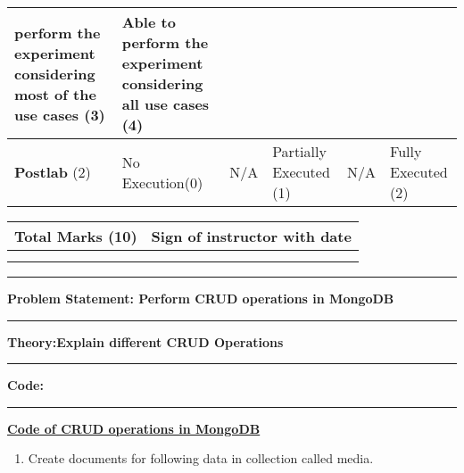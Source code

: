\documentclass[11pt,article]{memoir}
\begin{document}
\begin{flushleft}
\begin{tabular}{|p{2cm}|p{2cm}|p{2cm}|p{2cm}|p{2cm}|p{2cm}|}
                              perform the
                              experiment
                              considering
                              most of the
                              use cases (3)
                              & Able to
                              perform the
                              experiment
                              considering
                              all use cases
                              (4) \\ 
                             \hline \textbf{Postlab} (2) & No Execution(0) & N/A & Partially Executed (1) & N/A & Fully Executed (2) \\ 
                             \hline 
                             \end{tabular}
        \begin{table}[h!]
        \centering
        \begin{tabular}{|c|c|}
                \hline \textbf{Total Marks (10)} & \textbf{Sign of instructor with date} \\ 
                \hline  &  \\ & \\
                \hline 
                \end{tabular} 
        \end{table}
        
    \pagebreak


\maketitle

\hrule \vspace{0.2cm}
\textbf{Problem Statement: Perform CRUD operations in MongoDB}\hrule\vspace{0.2cm}
\textbf{Theory:Explain different CRUD Operations}\hrule\vspace{0.2cm}
\afterpage{\newpage~\newpage}\newpage
\textbf{Code:}\hrule
\vspace{0.5cm}
\textbf{\underline{Code of CRUD operations in MongoDB}}
\begin{enumerate}
\item Create documents for following data in collection called media.

\begin{table}[h]



\end{table}
\end{enumerate}
\end{flushleft}
\end{document}
